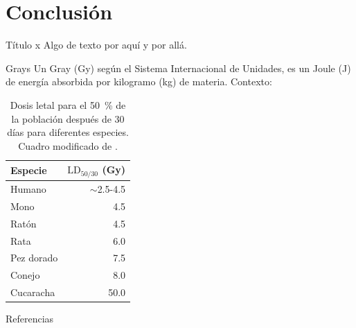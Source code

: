 \documentclass{beamer}
\begin{document}
\section{Conclusión}
\begin{frame}{Título x}
	Algo de texto por aquí y por allá.
\end{frame}
\appendix
\begin{frame}{Grays}
\label{backup:grays}
Un Gray (\si{\gray}) según el Sistema Internacional de Unidades, es un Joule (\si{\joule}) de energía absorbida por kilogramo (\si{\kilogram}) de materia.
Contexto:
\begin{table}[]
  \centering
  \begin{tabular}{lr}
  \toprule
  Especie & $\mathrm{LD}_{50/30}$ (\si{\gray})\\
  \midrule
  Humano & $\sim$2.5-4.5 \\
  Mono & 4.5 \\
  Ratón & 4.5 \\
  Rata & 6.0 \\
  Pez dorado & 7.5 \\
  Conejo & 8.0 \\
  Cucaracha & 50.0 \\
  \bottomrule
	\end{tabular}%
	\caption{Dosis letal para el \SI{50}{\percent} de la población después de 30 días para diferentes especies. Cuadro modificado de \cite{Bolus2017}. \hyperlink{teng}{}} 
	\label{tab:LD5030}
\end{table}
\end{frame}
\begin{frame}[allowframebreaks]{Referencias}
	
	
\end{frame}
\end{document}
